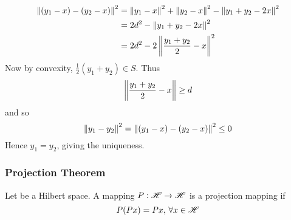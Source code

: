 \begin{proposition}
\begin{pf}{}{}
	\begin{equation}
		\begin{split}
			\left\|{(y_1-x)-(y_2-x)}\right\|^2&=\left\|{y_1-x}\right\|^2+\left\|{y_2-x}\right\|^2-\left\|{y_1+y_2-2x}\right\|^2\\
			&=2d^2-\left\|{y_1+y_2-2x}\right\|^2\\
			&=2d^2-2\left\|{\frac{y_1+y_2}{2}-x}\right\|^2\\
		\end{split}
	\end{equation}
	Now by convexity, $\frac{1}{2}(y_1+y_2)\in S$. Thus
	$$\left\|{\frac{y_1+y_2}{2}-x}\right\|\geq d$$
	and so
	$$
		\left\|{y_1-y_2}\right\|^2=\left\|{(y_1-x)-(y_2-x)}\right\|^2\leq0
	$$
	Hence $y_1=y_2$, giving the uniqueness.
\end{pf}
\end{proposition}



\subsubsection{Projection Theorem}
\begin{definition}\rm\nextline
	Let \hbs be a Hilbert space. A mapping $P:\mathscr{H}\xrightarrow{}\mathscr{H}$ is a projection mapping if $$
		P(Px)=Px,\,\forall x\in\mathscr{H}
	$$


\end{definition}


